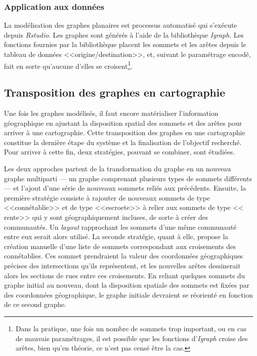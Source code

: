 \subsubsection{Application aux données}
La modélisation des graphes planaires est processus automatisé qui s'exécute depuis \textit{Rstudio}. Les graphes sont générés à l'aide de la bibliothèque \textit{Igraph}. Les fonctions fournies par la bibliothèque placent les sommets et les arêtes depuis le tableau de données <<origine/destination>>, et, suivant le paramétrage encodé, fait en sorte qu'aucune d'elles se croisent\footnote{Dans la pratique, une fois un nombre de sommets trop important, ou en cas de mauvais paramétrages, il est possible que les fonctions d'\textit{Igraph} croise des arêtes, bien qu'en théorie, ce n'est pas censé être la cas.}. 

\subsection{Transposition des graphes en cartographie}
Une fois les graphes modélisés, il faut encore matérialiser l'information géographique  en  ajustant la disposition spatial des sommets et des arêtes pour arriver à une cartographie.
Cette transposition des graphes en une cartographie constitue la dernière étape du système et la finalisation de l'objectif recherché. Pour arriver à cette fin, deux stratégies, pouvant se combiner, sont étudiées.

Les deux approches partent de la transformation du graphe en un nouveau graphe multiparti --- un graphe comprenant plusieurs types de sommets différents --- et l'ajout d'une série de nouveaux sommets reliés aux précédents. Ensuite, la première stratégie consiste à rajouter de nouveaux sommets de type <<connétablie>> et de type <<escroete>> à relier aux sommets de type << rente>> qui y sont géographiquement incluses,  de sorte à créer des communautés. Un \textit{layout} rapprochant les sommets d'une même communauté entre eux serait alors utilisé. La seconde stratégie, quant à elle, propose la création manuelle d'une liste de sommets correspondant aux croisements des connétablies. Ces sommet prendraient la valeur des coordonnées géographiques précises des intersections qu'ils représentent, et les nouvelles arêtes dessinerait alors les sections de rues entre ces croisements. En reliant quelques sommets du graphe initial au nouveau, dont la disposition spatiale des sommets est fixées par des coordonnées géographique, le graphe initiale devraient se réorienté en fonction de ce second graphe.